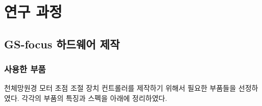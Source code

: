 \section{연구 과정}

\subsection{GS-focus 하드웨어 제작}

\subsubsection{사용한 부품}


천체망원경 모터 초점 조절 장치 컨트롤러를 제작하기 위해서 필요한 부품들을 선정하였다. 각각의 부품의 특징과 스펙을 아래에 정리하였다. 

